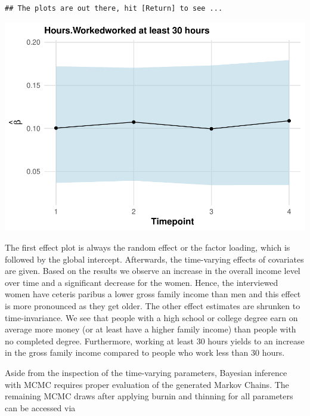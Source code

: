 \documentclass[a4paper, preprint, 3p,
authoryear]{elsarticle} %
\newenvironment{Shaded}{\begin{snugshade}}{\end{snugshade}}
\newcommand{\NormalTok}[1]{#1}
\begin{document}
\begin{verbatim}
## The plots are out there, hit [Return] to see ...
\end{verbatim}

\includegraphics[width=0.7\linewidth]{Vignette-for-panelTVP_files/figure-latex/myplot-5}

The first effect plot is always the random effect or the factor loading,
which is followed by the global intercept. Afterwards, the time-varying
effects of covariates are given. Based on the results we observe an
increase in the overall income level over time and a significant
decrease for the women. Hence, the interviewed women have ceteris
paribus a lower gross family income than men and this effect is more
pronounced as they get older. The other effect estimates are shrunken to
time-invariance. We see that people with a high school or college degree
earn on average more money (or at least have a higher family income)
than people with no completed degree. Furthermore, working at least 30
hours yields to an increase in the gross family income compared to
people who work less than 30 hours.

Aside from the inspection of the time-varying parameters, Bayesian
inference with MCMC requires proper evaluation of the generated Markov
Chains. The remaining MCMC draws after applying burnin and thinning for
all parameters can be accessed via

\begin{Shaded}
\end{Shaded}
\end{document}
